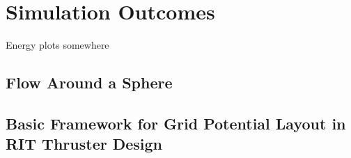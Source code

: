 \section{Simulation Outcomes}\label{Sec: Simulation Outcomes}

Energy plots somewhere

\subsection{Flow Around a Sphere}\label{Sec: Flow Around Sphere}

\subsection{Basic Framework for Grid Potential Layout in RIT Thruster Design}